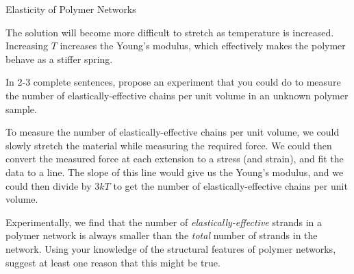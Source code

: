\begin{activity}{Elasticity of Polymer Networks}
\begin{ctqs}
		\begin{solution}[1.5in]
			The solution will become more difficult to stretch as temperature is increased.  Increasing $T$ increases the Young's modulus, which effectively makes the polymer behave as a stiffer spring.
		\end{solution}
	
	\question In 2-3 complete sentences, propose an experiment that you could do to measure the number of elastically-effective chains per unit volume in an unknown polymer sample.
	
		\begin{solution}[1.75in]
		
			To measure the number of elastically-effective chains per unit volume, we could slowly stretch the material while measuring the required force.  We could then convert the measured force at each extension to a stress (and strain), and fit the data to a line.  The slope of this line would give us the Young's modulus, and we could then divide by $3kT$ to get the number of elastically-effective chains per unit volume.
		
		\end{solution}
\end{ctqs}


\begin{exercises}

	\exercise Experimentally, we find that the number of \emph{elastically-effective} strands in a polymer network is always smaller than the \emph{total} number of strands in the network.  Using your knowledge of the structural features of polymer networks, suggest at least one reason that this might be true.
	
		\begin{solution}
		\end{solution}
	
	
	

\end{exercises}
\end{activity}
